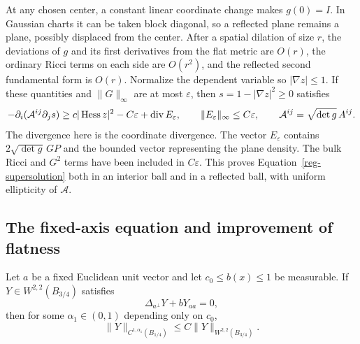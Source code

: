 At any chosen center, a constant linear coordinate change makes
$g(0)=I$. In Gaussian charts it can be taken block diagonal, so a
reflected plane remains a plane, possibly displaced from the center.
After a spatial dilation of size $r$, the deviations of $g$ and its
first derivatives from the flat metric are $O(r)$, the ordinary Ricci
terms on each side are $O(r^2)$, and the reflected second fundamental
form is $O(r)$. Normalize the dependent variable so $|\nabla z|\le1$.
If these quantities and $\|G\|_\infty$ are at most $\varepsilon$,
then $s=1-|\nabla z|^2\ge0$ satisfies
\begin{equation}
 -\partial_i(\mathcal A^{ij}\partial_js)
 \ge c|\operatorname{Hess} z|^2-C\varepsilon+\operatorname{div} E_\varepsilon,
 \qquad
 \|E_\varepsilon\|_\infty\le C\varepsilon,
 \qquad \mathcal A^{ij}=\sqrt{\det g}\,A^{ij}.
 \label{reg-supersolution}
\end{equation}
The divergence here is the coordinate divergence. The vector
$E_\varepsilon$ contains $2\sqrt{\det g}\,GP$ and the bounded
vector representing the plane density. The bulk Ricci and $G^2$
terms have been included in $C\varepsilon$. This proves
Equation~\eqref{reg-supersolution} both in an interior ball and in
a reflected ball, with uniform ellipticity of $\mathcal A$.

\subsection{The fixed-axis equation and improvement of flatness}

\begin{lemma}
\label{reg-fixed-axis}
Let $a$ be a fixed Euclidean unit vector and let $c_0\le b(x)\le1$
be measurable. If $Y\in W^{2,2}(B_{3/4})$ satisfies
\begin{equation}
 \Delta_{a^\perp}Y+bY_{aa}=0,
 \label{reg-fixed-equation}
\end{equation}
then for some $\alpha_1\in(0,1)$ depending only on $c_0$,
\begin{equation}
 \|Y\|_{C^{1,\alpha_1}(B_{1/4})}
       \le C\|Y\|_{W^{2,2}(B_{3/4})}.
 \label{reg-fixed-axis-estimate}
\end{equation}
\end{lemma}

